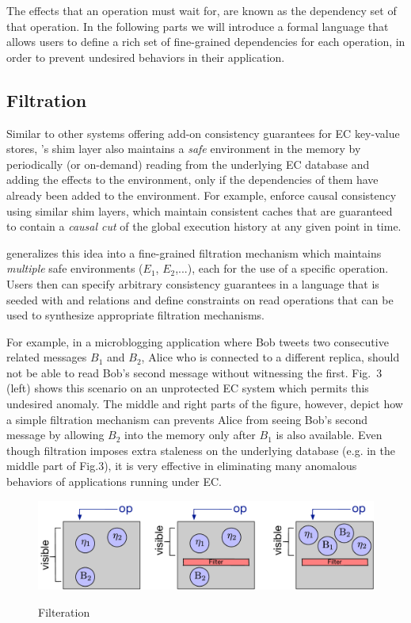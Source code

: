 \documentclass[authorversion]{sig-alternate-05-2015}
\begin{document}
The effects that an operation must wait for, are known as the dependency set of that operation. 
In the following parts we will introduce a formal language that allows users to define 
a rich set of fine-grained dependencies for each operation, in order to 
prevent undesired behaviors in their application.

\subsection{Filtration}
Similar to other systems offering add-on consistency guarantees for EC
key-value stores, \tool's shim layer also maintains
a \emph{safe} environment in the memory by periodically (or on-demand)
reading from the underlying EC database and adding the effects to the
environment, only if the dependencies of them have already been added to
the environment. 
For example, \cite{bolton,quelea} enforce causal
consistency using similar shim layers, which maintain consistent caches
that are guaranteed to
contain a \emph{causal cut} of the global execution history at any
given point in time.

\tool\; generalizes this idea into a fine-grained filtration mechanism
which maintains \emph{multiple} safe environments ($E_1$, $E_2$,...),
each for the use of a specific operation. Users then can specify arbitrary
consistency guarantees in a
language that is seeded with \sor and \visib relations and define constraints 
on read operations that can be used to synthesize appropriate filtration  mechanisms.

For example, in a microblogging application where Bob tweets two
consecutive related
messages $B_1$ and $B_2$, Alice who is connected to a different replica, should not be
able to read Bob's second message without witnessing the first. 
Fig.~3 (left) shows this scenario on an unprotected EC system which
permits this undesired anomaly. The middle and right parts of the
figure,
however,
depict how a simple
filtration mechanism can prevents Alice from seeing Bob's second
message by allowing $B_2$ into the memory only after $B_1$ is also
available. Even though filtration imposes extra staleness on the
underlying database (e.g. in the middle part of Fig.3), it is very
effective in eliminating many anomalous behaviors of applications
running under EC.

\begin{figure}[h]
\centering
\includegraphics[scale=0.37]{Figures/ub.pdf}
\label{fig:filter}
\caption{Filteration}
\end{figure}
\end{document}
